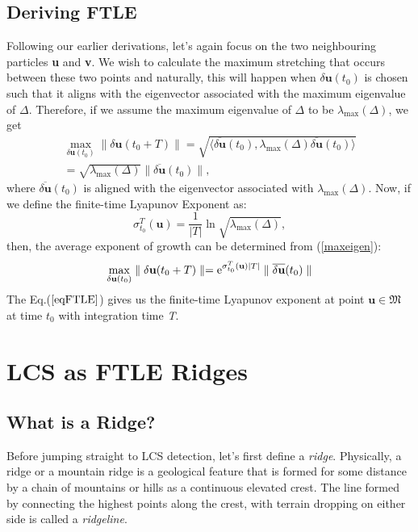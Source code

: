 \subsection{Deriving FTLE}
Following our earlier derivations, let's again focus on the two neighbouring particles \textbf{u} and \textbf{v}. We wish to calculate the maximum stretching that occurs between these two points and naturally, this will happen when $ \delta \textbf{u}(t_{0}) $ is chosen such that it aligns with the eigenvector associated with the maximum eigenvalue of $\Delta$. Therefore, if we assume the maximum eigenvalue of $\Delta$ to be $\lambda_{\max}(\Delta)$, we get 
\begin{equation}
	\begin{split}\label{maxeigen}
		 \max_{\delta\textbf{u}(t_{0})}\parallel\delta\textbf{u}(t_{0} + T)\parallel = \sqrt{\big\langle \overline{\delta \textbf{u}}(t_{0}), \lambda_{\max}(\Delta) \overline{\delta \textbf{u}}(t_{0}) \big\rangle }\\ 
		 = \sqrt{\lambda_{\max}(\Delta)}\parallel\overline{\delta\textbf{u}}(t_{0})\parallel,
	 \end{split}
\end{equation}
where $ \overline{\delta\textbf{u}}(t_{0}) $ is aligned with the eigenvector associated with $\lambda_{\max}(\Delta)$. Now, if we define the finite-time Lyapunov Exponent as:
\begin{equation}
\sigma_{t_{0}}^{T} (\textbf{u}) = \frac{1}{\vert T \vert} \ln \sqrt{\lambda_{\max}(\Delta)},
\end{equation} 
then, the average exponent of growth can be determined from (\ref{maxeigen}):
\begin{equation} \label{eqFTLE}
	\max_{\delta\textbf{u}(t_{0})}\parallel\delta\textbf{u}(t_{0} + T)\parallel = \mathrm{e} ^{\sigma_{t_{0}}^{T} (\textbf{u})\vert T \vert}\parallel\overline{\delta\textbf{u}}(t_{0})\parallel
\end{equation}
The Eq.($\ref{eqFTLE}$) gives us the finite-time Lyapunov exponent at point $\textbf{u}\in \mathfrak{M}$ at time $t_{0}$ with integration time \textit{T}.

\section{LCS as FTLE Ridges}

\subsection{What is a Ridge?}
Before jumping straight to LCS detection, let's first define a \textit{ridge}. Physically, a ridge or a mountain ridge is a geological feature that is formed for some distance by a chain of mountains or hills as a continuous elevated crest. The line formed by connecting the highest points along the crest, with terrain dropping on either side is called a \textit{ridgeline}.

